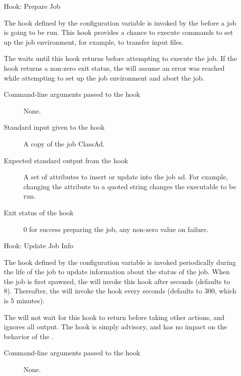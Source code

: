 \begin{itemize}
\item[Hook: Prepare Job]

The hook defined by the configuration variable
 is invoked by the  before
a job is going to be run.
This hook provides a chance to execute commands to set up the job
environment, for example, to transfer input files.

The  waits until this hook returns before
attempting to execute the job.
If the hook returns a non-zero exit status, the  will
assume an error was reached while attempting to set up the job
environment and abort the job.

\begin{description}
\item[Command-line arguments passed to the hook]
  None.

\item[Standard input given to the hook]
  A copy of the job ClassAd.

\item[Expected standard output from the hook]
  A set of attributes to insert or update into the job ad.  For example,
  changing the  attribute to a quoted string changes the executable 
  to be run.

\item[Exit status of the hook]
  0 for success preparing the job, any non-zero value on failure.
\end{description}


\item[Hook:  Update Job Info]

The hook defined by the configuration variable
 is invoked periodically during the
life of the job to update information about the status of the job.
When the job is first spawned, the  will invoke this
hook after  seconds
(defaults to 8).
Thereafter, the  will invoke the hook every 
 seconds (defaults to 300,
which is 5 minutes).

The  will not wait for this hook to return before
taking other actions, and ignores all output.
The hook is simply advisory, and has no impact on the behavior of the
.


\begin{description}
\item[Command-line arguments passed to the hook]
  None.


\end{description}
\end{itemize}
